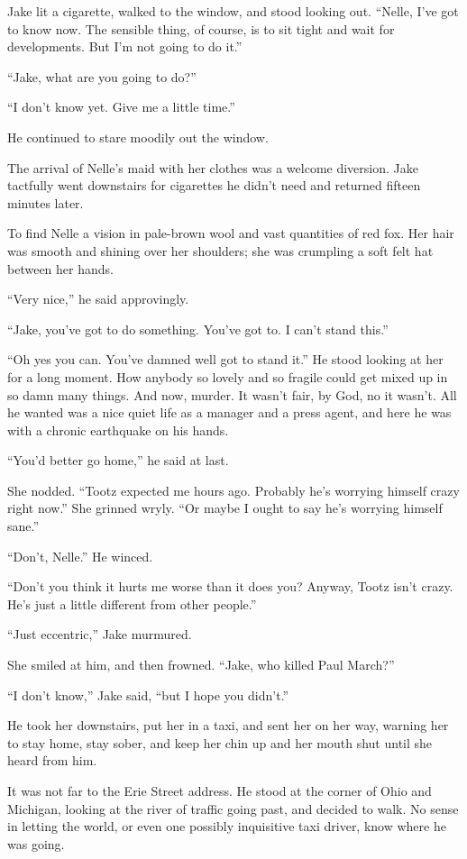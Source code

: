 \documentclass{novel}
\begin{document}
Jake lit a cigarette, walked to the window, and stood looking out. “Nelle, I’ve got to know now. The sensible thing, of course, is to sit tight and wait for developments. But I’m not going to do it.”

“Jake, what are you going to do?”

“I don’t know yet. Give me a little time.”

He continued to stare moodily out the window.

The arrival of Nelle’s maid with her clothes was a welcome diversion. Jake tactfully went downstairs for cigarettes he didn’t need and returned fifteen minutes later.

To find Nelle a vision in pale-brown wool and vast quantities of red fox. Her hair was smooth and shining over her shoulders; she was crumpling a soft felt hat between her hands.

“Very nice,” he said approvingly.

“Jake, you’ve got to do something. You’ve got to. I can’t stand this.”

“Oh yes you can. You’ve damned well got to stand it.” He stood looking at her for a long moment. How anybody so lovely and so fragile could get mixed up in so damn many things. And now, murder. It wasn’t fair, by God, no it wasn’t. All he wanted was a nice quiet life as a manager and a press agent, and here he was with a chronic earthquake on his hands.

“You’d better go home,” he said at last.

She nodded. “Tootz expected me hours ago. Probably he’s worrying himself crazy right now.” She grinned wryly. “Or maybe I ought to say he’s worrying himself sane.”

“Don’t, Nelle.” He winced.

“Don’t you think it hurts me worse than it does you? Anyway, Tootz isn’t crazy. He’s just a little different from other people.”

“Just eccentric,” Jake murmured.

She smiled at him, and then frowned. “Jake, who killed Paul March?”

“I don’t know,” Jake said, “but I hope you didn’t.”

He took her downstairs, put her in a taxi, and sent her on her way, warning her to stay home, stay sober, and keep her chin up and her mouth shut until she heard from him.

It was not far to the Erie Street address. He stood at the corner of Ohio and Michigan, looking at the river of traffic going past, and decided to walk. No sense in letting the world, or even one possibly inquisitive taxi driver, know where he was going.
\end{document}
